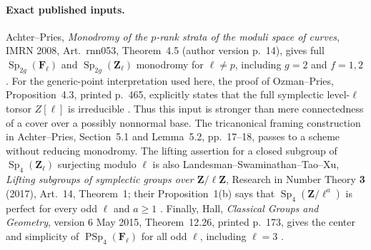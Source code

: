 \paragraph{Exact published inputs.}
Achter--Pries, \emph{Monodromy of the $p$-rank strata of the
moduli space of curves}, IMRN 2008, Art.~rnn053,
Theorem~4.5 (author version p.~14), gives full
$\operatorname{Sp}_{2g}(\mathbf F_\ell)$ and
$\operatorname{Sp}_{2g}(\mathbf Z_\ell)$ monodromy for
$\ell\ne p$, including $g=2$ and $f=1,2$
\cite{AchterPries2008}.
For the generic-point interpretation used here, the proof
of Ozman--Pries, Proposition~4.3, printed p.~465, explicitly
states that the full symplectic level-$\ell$ torsor $Z[\ell]$
is irreducible \cite[Proposition~4.3, proof]{OzmanPries2019}.
Thus this input is stronger than mere
connectedness of a cover over a possibly nonnormal base.
The tricanonical framing construction in Achter--Pries,
Section~5.1 and Lemma~5.2, pp.~17--18, passes to a scheme
without reducing monodromy.  The lifting assertion for a
closed subgroup of $\operatorname{Sp}_4(\mathbf Z_\ell)$
surjecting modulo $\ell$ is also
Landesman--Swaminathan--Tao--Xu,
\emph{Lifting subgroups of symplectic groups over
$\mathbf Z/\ell\mathbf Z$}, Research in Number Theory \textbf{3}
(2017), Art.~14, Theorem~1; their Proposition~1(b) says that
$\operatorname{Sp}_4(\mathbf Z/\ell^a)$ is perfect for every
odd $\ell$ and $a\ge1$ \cite{LSTX2017}.  Finally, Hall,
\emph{Classical Groups and Geometry}, version 6 May 2015,
Theorem~12.26, printed p.~173, gives the center and simplicity
of $\operatorname{PSp}_4(\mathbf F_\ell)$ for all odd $\ell$,
including $\ell=3$ \cite{Hall2015}.

